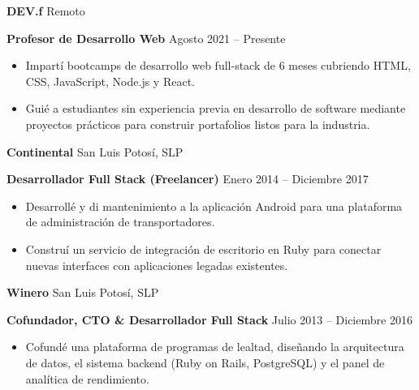 \documentclass[11pt]{article}
\begin{document}
\vspace{8pt}

\textbf{DEV.f} \hfill Remoto

\textbf{Profesor de Desarrollo Web} \hfill Agosto 2021 -- Presente
\begin{itemize}[noitemsep, topsep=0pt, partopsep=0pt, parsep=0pt]
    \item Impartí bootcamps de desarrollo web full-stack de 6 meses cubriendo HTML, CSS, JavaScript, Node.js y React.
    \item Guié a estudiantes sin experiencia previa en desarrollo de software mediante proyectos prácticos para construir portafolios listos para la industria.
\end{itemize}

\vspace{8pt}

\textbf{Continental} \hfill San Luis Potosí, SLP

\textbf{Desarrollador Full Stack (Freelancer)} \hfill Enero 2014 -- Diciembre 2017
\begin{itemize}[noitemsep, topsep=0pt, partopsep=0pt, parsep=0pt]
    \item Desarrollé y di mantenimiento a la aplicación Android para una plataforma de administración de transportadores.
    \item Construí un servicio de integración de escritorio en Ruby para conectar nuevas interfaces con aplicaciones legadas existentes.
\end{itemize}

\vspace{8pt}

\textbf{Winero} \hfill San Luis Potosí, SLP

\textbf{Cofundador, CTO \& Desarrollador Full Stack} \hfill Julio 2013 -- Diciembre 2016
\begin{itemize}[noitemsep, topsep=0pt, partopsep=0pt, parsep=0pt]
    \item Cofundé una plataforma de programas de lealtad, diseñando la arquitectura de datos, el sistema backend (Ruby on Rails, PostgreSQL) y el panel de analítica de rendimiento.
\end{itemize}

\vspace{12pt}
\end{document}
